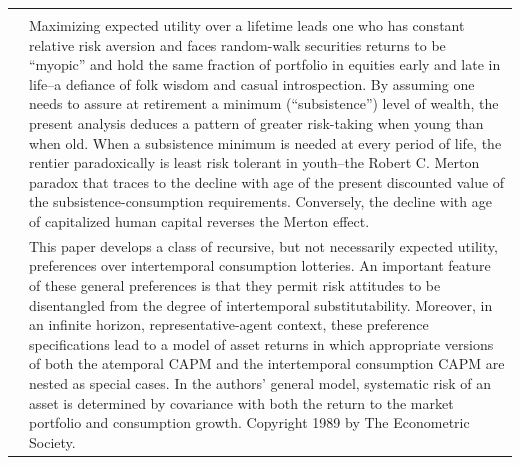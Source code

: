 \documentclass{article}
\begin{document}
\begin{tabular}{p{}p{}}
\cite{Merton_1971} &  \\
\cite{Samuelson_1989} & Maximizing expected utility over a lifetime leads one who has constant relative risk aversion and faces random-walk securities returns to be ``myopic'' and hold the same fraction of portfolio in equities early and late in life--a defiance of folk wisdom and casual introspection. By assuming one needs to assure at retirement a minimum (``subsistence'') level of wealth, the present analysis deduces a pattern of greater risk-taking when young than when old. When a subsistence minimum is needed at every period of life, the rentier paradoxically is least risk tolerant in youth--the Robert C. Merton paradox that traces to the decline with age of the present discounted value of the subsistence-consumption requirements. Conversely, the decline with age of capitalized human capital reverses the Merton effect. \\
\cite{Epstein_1989} & This paper develops a class of recursive, but not necessarily expected utility, preferences over intertemporal consumption lotteries. An important feature of these general preferences is that they permit risk attitudes to be disentangled from the degree of intertemporal substitutability. Moreover, in an infinite horizon, representative-agent context, these preference specifications lead to a model of asset returns in which appropriate versions of both the atemporal CAPM and the intertemporal consumption CAPM are nested as special cases. In the authors' general model, systematic risk of an asset is determined by covariance with both the return to the market portfolio and consumption growth. Copyright 1989 by The Econometric Society. \\

\end{tabular}
\end{document}
